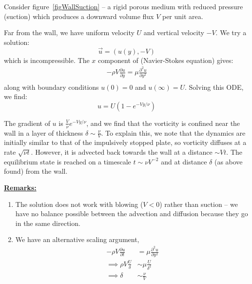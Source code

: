 \documentclass[../Main.tex]{subfiles}
\begin{document}
\begin{example}
    Consider figure~\ref{figWallSuction} -- a rigid porous medium with reduced pressure (suction) which produces a downward volume flux $V$ per unit area.

    Far from the wall, we have uniform velocity $U$ and vertical velocity $-V$. We try a solution:
    \begin{equation*}
        \vec u = (u(y), -V)
    \end{equation*}
    which is incompressible. The $x$ component of  (Navier-Stokes equation) gives:
    \begin{align*}
        -\rho V \frac{\partial u}{\partial y} = \mu \frac{\partial^{2}u}{\partial y^{2}} \\
    \end{align*}
    along with boundary conditions $u(0) = 0$ and $u(\infty) = U$. Solving this ODE, we find:
    \begin{equation*}
        u = U(1 - e^{-V y / \nu})
    \end{equation*}
    
    The gradient of $u$ is $\frac{V}{\nu} e^{-Vy / \nu}$, and we find that the vorticity is confined near the wall in a layer of thickness $\delta \sim \frac{\nu}{V}$. To explain this, we note that the dynamics are initially similar to that of the impulsively stopped plate, so vorticity diffuses at a rate $\sqrt{\nu t}$. However, it is advected back towards the wall at a distance $\sim V t$. The equilibrium state is reached on a timescale $t \sim \nu V^{-2}$ and at distance $\delta$ (as above found) from the wall.

    \underline{\textbf{Remarks:}}
    \begin{enumerate}
        \item The solution does not work with blowing ($V < 0$) rather than suction -- we have no balance possible between the advection and diffusion because they go in the same direction.
        \item We have an alternative scaling argument,
            \begin{align*}
                -\rho V \frac{\partial u}{\partial t} &= \mu \frac{\partial^{2}u}{\partial y^{2}} \\
                \implies \rho V \frac{U}{\delta} &\sim \mu \frac{U}{\delta^2} \\
                \implies \delta &\sim \frac{\nu}{V}
            \end{align*}
    \end{enumerate}
\end{example}
\end{document}
